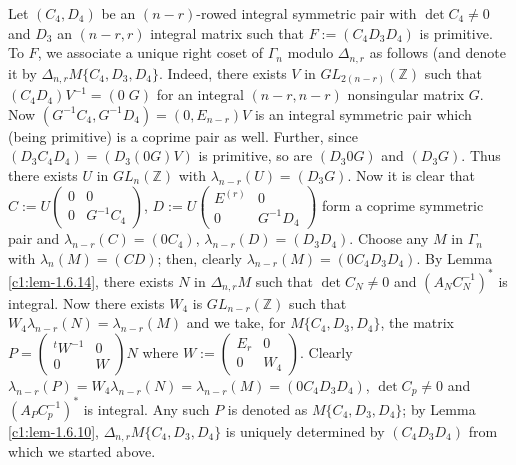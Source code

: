 Let $(C_{4},D_{4})$ be an $(n-r)$-rowed integral symmetric pair with\break
$\det C_{4}\neq 0$ and $D_{3}$ an $(n-r,r)$ integral matrix such that
$F:=(C_{4}D_{3}D_{4})$ is primitive. To $F$, we associate a unique
right coset of $\Gamma_{n}$ modulo $\Delta_{n,r}$ as follows (and
denote it by $\Delta_{n,r}M\{C_{4},D_{3},D_{4}\}$. Indeed, there
exists $V$ in $GL_{2(n-r)}(\mathbb{Z})$ such that
$(C_{4}D_{4})V^{-1}=(0 \; G)$ for an integral $(n-r,n-r)$ nonsingular
matrix $G$. Now $(G^{-1}C_{4},G^{-1}D_{4})=(0,E_{n-r})V$ is an
integral symmetric pair which (being primitive) is a coprime pair as
well. Further, since $(D_{3}C_{4}D_{4})=(D_{3}(0G)V)$ is primitive, so
are $(D_{3}0G)$ and $(D_{3}G)$. Thus there exists $U$ in
$GL_{n}(\mathbb{Z})$ with $\lambda_{n-r}(U)=(D_{3}G)$. Now it is clear
that $C:=U\left(\begin{smallmatrix} 0 & 0\\ 0 & G^{-1}C_{4}
\end{smallmatrix}\right)$, $D:=U\left(\begin{smallmatrix} E^{(r)} &
  0\\ 0 & G^{-1}D_{4}\end{smallmatrix}\right)$ form a coprime
symmetric pair and $\lambda_{n-r}(C)=(0C_{4})$,
$\lambda_{n-r}(D)=(D_{3}D_{4})$. Choose any $M$ in $\Gamma_{n}$ with
$\lambda_{n}(M)=(CD)$; then, clearly
$\lambda_{n-r}(M)=(0C_{4}D_{3}D_{4})$. By Lemma \ref{c1:lem-1.6.14},
there exists $N$ in $\Delta_{n,r}M$ such that $\det C_{N}\neq 0$ and
$(A_{N}C^{-1}_{N})^{\ast}$ is integral. Now there exists $W_{4}$ is
$GL_{n-r}(\mathbb{Z})$ such that
$W_{4}\lambda_{n-r}(N)=\lambda_{n-r}(M)$ and we take, for
$M\{C_{4},D_{3},D_{4}\}$, the matrix $P=\left(\begin{smallmatrix}
  {}^{t}W^{-1} & 0\\ 0 & W\end{smallmatrix}\right)N$ where
  $W:=\left(\begin{smallmatrix} E_{r} & 0\\ 0 & W_{4}
  \end{smallmatrix}\right)$. Clearly
  $\lambda_{n-r}(P)=W_{4}\lambda_{n-r}(N)=\lambda_{n-r}(M)=(0C_{4}D_{3}D_{4})$,
  $\det C_{p}\neq 0$ and $(A_{P}C^{-1}_{p})^{\ast}$ is integral. Any
  such $P$ is denoted as $M\{C_{4},D_{3},D_{4}\}$; by Lemma
  \ref{c1:lem-1.6.10}, $\Delta_{n,r}M\{C_{4},D_{3},D_{4}\}$ is uniquely
  determined by $(C_{4}D_{3}D_{4})$ from which we started above.

